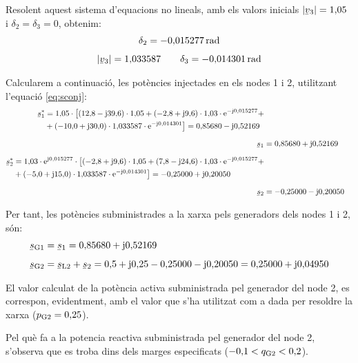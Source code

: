 \begin{exemple}
Resolent aquest sistema d'equacions no lineals, amb els valors
inicials $|\cmplx{v}_3|=1{,}05$ i $\delta_2=\delta_3=0$, obtenim:
\begin{gather*}
   \delta_2=-0{,}015277\unit{rad} \\[1ex]
   |\cmplx{v}_3|=1{,}033587 \qquad \delta_3=-0{,}014301\unit{rad}
\end{gather*}

Calcularem a continuaci\'{o}, les pot\`{e}ncies injectades en els nodes 1 i
2, utilitzant l'equaci\'{o} \eqref{eq:sconj}:
\begin{align*}
\begin{split}
\cmplx{s}_1^* &= 1{,}05 \cdot\bigl[ (12{,}8-\ju39{,}6) \cdot 1{,}05
+
(-2{,}8+\ju9{,}6) \cdot 1{,}03\cdot\eu^{-\ju0{,}015277} + \\
&+ (-10{,}0+\ju30{,}0) \cdot 1{,}033587\cdot\eu^{-\ju0{,}014301}
\bigr] = 0{,}85680 - \ju 0{,}52169
\end{split} \\[1.5ex]
\cmplx{s}_1 &= 0{,}85680 + \ju 0{,}52169 \\[1.5ex]
\begin{split}
\cmplx{s}_2^* &= 1{,}03 \cdot\eu^{\ju0{,}015277} \cdot\bigl[
(-2{,}8+\ju9{,}6) \cdot 1{,}05 +
 (7{,}8-\ju24{,}6) \cdot 1{,}03\cdot\eu^{-\ju0{,}015277} + \\
& + (-5{,}0+\ju15{,}0) \cdot 1{,}033587\cdot\eu^{-\ju0{,}014301}
\bigr] = -0{,}25000 + \ju 0{,}20050
\end{split} \\[1.5ex]
 \cmplx{s}_2 &= -0{,}25000 - \ju 0{,}20050
\end{align*}

Per tant, les pot\`{e}ncies subministrades a la xarxa pels generadors
dels nodes 1 i 2, s\'{o}n:
\begin{align*}
\cmplx{s}\ped{G1} &= \cmplx{s}_1 = 0{,}85680 + \ju 0{,}52169 \\[1ex]
\cmplx{s}\ped{G2} &= \cmplx{s}\ped{L2} + \cmplx{s}_2 = 0{,}5 + \ju
0{,}25 -0{,}25000 - \ju 0{,}20050  = 0{,}25000 + \ju 0{,}04950
\end{align*}

El valor calculat de la pot\`{e}ncia activa subministrada pel generador
del node 2, es
 correspon, evidentment, amb el valor que s'ha utilitzat com a dada per
resoldre la xarxa ($p_\mathrm{G2}=0{,}25$).

Pel qu\`{e} fa a la potencia reactiva subministrada pel generador del
node 2, s'observa que es troba dins dels  marges especificats
($-0{,}1<q_\mathrm{G2}<0{,}2$).
\end{exemple}

